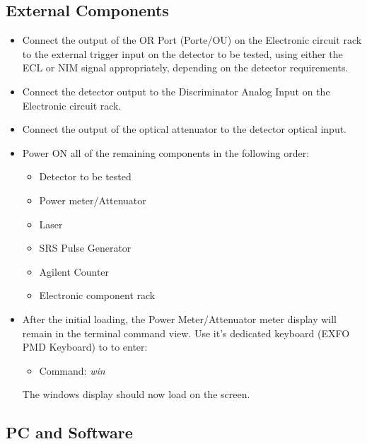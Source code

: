 \documentclass{article}
\begin{document}

\subsection{External Components}

\begin{itemize}

\item
Connect the output of the OR Port (Porte/OU) on the Electronic circuit rack to the external trigger input on the detector to be tested, using either the ECL or NIM signal appropriately, depending on the detector requirements.

\item
Connect the detector output to the Discriminator Analog Input on the Electronic circuit rack.

\item
Connect the output of the optical attenuator to the detector optical input. 

\item
Power ON all of the remaining components in the following order:

\begin{itemize}
\item{Detector to be tested}
\item{Power meter/Attenuator}
\item{Laser}
\item{SRS Pulse Generator}
\item{Agilent Counter}
\item{Electronic component rack}
\end{itemize}

\item
After the initial loading, the Power Meter/Attenuator meter display will remain in the terminal command view. Use it's dedicated keyboard (EXFO PMD Keyboard) to to enter:

\begin{itemize}

\item
Command: \emph{win}
\end{itemize}
The windows display should now load on the screen. 

\end{itemize}


\subsection{PC and Software}
\end{document}
